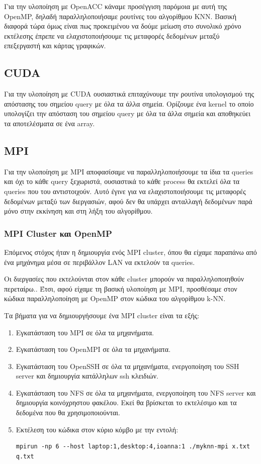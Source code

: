 \documentclass[11pt]{scrartcl} %
\begin{document}
Για την υλοποίηση με OpenACC κάναμε προσέγγιση παρόμοια με αυτή της OpenMP, δηλαδή
παραλληλοποιήσαμε ρουτίνες του αλγορίθμου KNN. 
Βασική διαφορά τώρα όμως είναι πως προκειμένου να δούμε μείωση στο συνολικό χρόνο εκτέλεσης έπρεπε 
να ελαχιστοποιήσουμε τις μεταφορές δεδομένων μεταξύ επεξεργαστή και κάρτας γραφικών.

\subsection{CUDA}

Για την υλοποίηση με CUDA ουσιαστικά επιταχύνουμε την ρουτίνα υπολογισμού της απόστασης του σημείου
query με όλα τα άλλα σημεία.
Ορίζουμε ένα kernel  το οποίο υπολογίζει την απόσταση του σημείου query με όλα τα άλλα σημεία 
και αποθηκεύει τα αποτελέσματα σε ένα array.

\subsection{MPI}

Για την υλοποίηση με MPI αποφασίσαμε να παραλληλοποιήσουμε τα ίδια τα queries και όχι το κάθε query ξεχωριστά, 
ουσιαστικά το κάθε process θα εκτελεί όλα τα queries που του αντιστοιχούν.
Αυτό έγινε για να ελαχιστοποιήσουμε τις μεταφορές δεδομένων μεταξύ των διεργασιών, αφού δεν θα υπάρχει ανταλλαγή δεδομένων παρά μόνο στην εκκίνηση και στη λήξη του αλγορίθμου.

\subsubsection{MPI Cluster και OpenMP}

Επόμενος στόχος ήταν η δημιουργία ενός MPI cluster, όπου θα είχαμε παραπάνω από ένα μηχάνημα μέσα σε περιβάλλον LAN να εκτελούν τα queries.

Οι διεργασίες που εκτελούνται στον κάθε cluster μπορούν να παραλληλοποιηθούν περεταίρω..
Έτσι, αφού είχαμε τη βασική υλοποίηση με MPI, προσθέσαμε στον κώδικα παραλληλοποίηση με OpenMP στον κώδικα του αλγορίθμου k-NN.

Τα βήματα για να δημιουργήσουμε ένα MPI cluster είναι τα εξής:

\begin{enumerate}
\item Εγκατάσταση του MPI σε όλα τα μηχανήματα.
\item Εγκατάσταση του OpenMPI σε όλα τα μηχανήματα.
\item Εγκατάσταση του OpenSSH σε όλα τα μηχανήματα, ενεργοποίηση του SSH server και δημιουργία κατάλληλων ssh κλειδιών.
\item Εγκατάσταση του NFS \cite{nfs} σε όλα τα μηχανήματα, ενεργοποίηση του NFS server και
        δημιουργία κοινόχρηστου φακέλου. Εκεί θα βρίσκεται το εκτελέσιμο και τα
        δεδομένα που θα χρησιμοποιούνται.
\item Εκτέλεση του κώδικα στον κύριο κόμβο με την εντολή:
\begin{lstlisting}
mpirun -np 6 --host laptop:1,desktop:4,ioanna:1 ./myknn-mpi x.txt q.txt
\end{lstlisting}
\end{enumerate}
\end{document}
